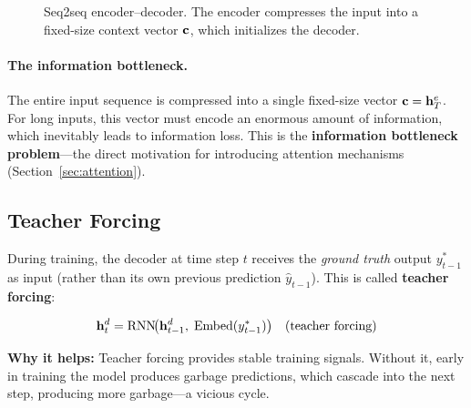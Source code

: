 \begin{figure}[H]
\caption{Seq2seq encoder--decoder.  The encoder compresses the input into
a fixed-size context vector $\mathbf{c}$, which initializes the decoder.}
\label{fig:seq2seq}
\end{figure}

\paragraph{The information bottleneck.}
The entire input sequence is compressed into a single fixed-size vector
$\mathbf{c} = \mathbf{h}_T^e$.  For long inputs, this vector must encode an enormous
amount of information, which inevitably leads to information loss.  This
is the \textbf{information bottleneck problem}---the direct motivation for
introducing attention mechanisms (Section~\ref{sec:attention}).

\subsection{Teacher Forcing}

During training, the decoder at time step $t$ receives the \emph{ground
truth} output $y_{t-1}^*$ as input (rather than its own previous
prediction $\hat{y}_{t-1}$).  This is called \textbf{teacher forcing}:

\begin{equation}
\mathbf{h}_t^d = \text{RNN}\!\bigl(\mathbf{h}_{t-1}^d,\; \text{Embed}(y_{t-1}^*)\bigr)
\quad \text{(teacher forcing)}
\end{equation}

\textbf{Why it helps:} Teacher forcing provides stable training signals.
Without it, early in training the model produces garbage predictions, which
cascade into the next step, producing more garbage---a vicious cycle.

